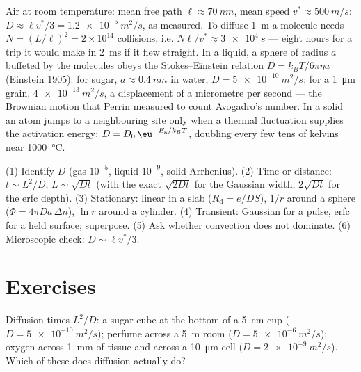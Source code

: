 \begin{example}\label{ex:b2:particle-diffusion:kinetic}
Air at room temperature: mean free path $\ell \approx \qty{70}{nm}$,
mean speed $v^* \approx \qty{500}{m/s}$: $D \approx \ell v^*/3 =
\qty{1.2e-5}{m^2/s}$, as measured. To diffuse \qty{1}{m} a molecule
needs $N = (L/\ell)^2 = 2 \times 10^{14}$ collisions, i.e. $N\ell/v^*
\approx \qty{3e4}{s}$ --- eight hours for a trip it would make in
\qty{2}{ms} if it flew straight. In a liquid, a sphere of radius $a$
buffeted by the molecules obeys the Stokes--Einstein relation $D =
k_BT/6\pi\eta a$ (Einstein 1905): for sugar, $a \approx \qty{0.4}{nm}$
in water, $D = \qty{5e-10}{m^2/s}$; for a \qty{1}{\micro m} grain,
$\qty{4e-13}{m^2/s}$, a displacement of a micrometre per second ---
the Brownian motion that Perrin measured to count Avogadro's number. In
a solid an atom jumps to a neighbouring site only when a thermal
fluctuation supplies the activation energy: $D = D_0\,\eu^{-E_{\text{a}}/k_BT}$,
doubling every few tens of kelvins near \qty{1000}{\celsius}.
\end{example}

\begin{method}\label{meth:b2:particle-diffusion:method}
(1) Identify $D$ (gas $10^{-5}$, liquid $10^{-9}$, solid Arrhenius).
(2) Time or distance: $t \sim L^2/D$, $L \sim \sqrt{Dt}$ (with the exact
$\sqrt{2Dt}$ for the Gaussian width, $2\sqrt{Dt}$ for the erfc depth).
(3) Stationary: linear in a slab ($R_{\text{d}} = e/DS$), $1/r$ around a
sphere ($\Phi = 4\pi D a\,\Delta n$), $\ln r$ around a cylinder. (4)
Transient: Gaussian for a pulse, erfc for a held surface; superpose.
(5) Ask whether convection does not dominate. (6) Microscopic check:
$D \sim \ell v^*/3$.
\end{method}

\section{Exercises}

\begin{exercise}[$\star$]\label{exo:b2:particle-diffusion:1}
Diffusion times $L^2/D$: a sugar cube at the bottom of a \qty{5}{cm}
cup ($D = \qty{5e-10}{m^2/s}$); perfume across a \qty{5}{m} room ($D =
\qty{5e-6}{m^2/s}$); oxygen across \qty{1}{mm} of tissue and across a
\qty{10}{\micro m} cell ($D = \qty{2e-9}{m^2/s}$). Which of these does
diffusion actually do?
\end{exercise}

